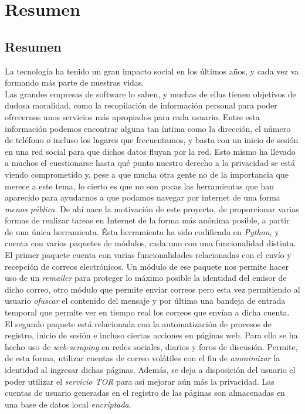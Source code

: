 \chapter*{Resumen}

\section*{Resumen}
La tecnología ha tenido un gran impacto social en los últimos años, y cada vez va formando más parte de nuestras vidas.\\
Las grandes empresas de software lo saben, y muchas de ellas tienen objetivos de dudosa moralidad, como la recopilación de información personal para poder ofrecernos unos servicios más apropiados para cada usuario. Entre esta información podemos encontrar alguna tan íntima como la dirección, el número de teléfono o incluso los lugares que frecuentamos, y basta con un inicio de sesión en una red social para que dichos datos fluyan por la red.
Esto mismo ha llevado a muchos el cuestionarse hasta qué punto nuestro derecho a la privacidad se está viendo comprometido y, pese a que mucha otra gente no de la importancia que merece a este tema, lo cierto es que no son pocas las herramientas que han aparecido para ayudarnos a que podamos navegar por internet de una forma \textit{menos pública}.
De ahí nace la motivación de este proyecto, de proporcionar varias formas de realizar tareas en Internet de la forma más anónima posible, a partir de una única herramienta. Ésta herramienta ha sido codificada en \textit{Python}, y cuenta con varios paquetes de módulos, cada uno con una funcionalidad distinta.\\
El primer paquete cuenta con varias funcionalidades relacionadas con el envío y recepción de correos electrónicos. Un módulo de ese paquete nos permite hacer uso de un \textit{remailer} para proteger lo máximo posible la identidad del emisor de dicho correo, otro módulo que permite enviar correos pero esta vez permitiendo al usuario \textit{ofuscar} el contenido del mensaje y por último una bandeja de entrada temporal que permite ver en tiempo real los correos que envían a dicha cuenta.\\
El segundo paquete está relacionada con la automatización de procesos de registro, inicio de sesión e incluso ciertas acciones en páginas web. Para ello se ha hecho uso de \textit{web-scraping} en redes sociales, diarios y foros de discusión. Permite, de esta forma, utilizar cuentas de correo volátiles con el fin de \textit{anonimizar} la identidad al ingresar dichas páginas. Además, se deja a disposición del usuario el poder utilizar el \textit{servicio TOR} para así mejorar aún más la privacidad. Las cuentas de usuario generadas en el registro de las páginas son almacenadas en una base de datos local \textit{encriptada}. \\
